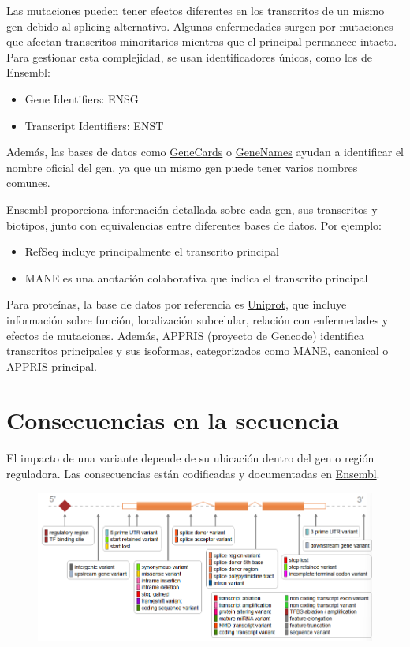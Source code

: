Las mutaciones pueden tener efectos diferentes en los transcritos de un mismo gen debido al splicing alternativo. Algunas enfermedades surgen por mutaciones que afectan transcritos minoritarios mientras que el principal permanece intacto. Para gestionar esta complejidad, se usan identificadores únicos, como los de Ensembl:
\begin{itemize}
\item Gene Identifiers: ENSG 
\item Transcript Identifiers: ENST
\end{itemize}

Además, las bases de datos como \href{https://www.genecards.org/}{GeneCards} o \href{https://www.genenames.org/}{GeneNames} ayudan a identificar el nombre oficial del gen, ya que un mismo gen puede tener varios nombres comunes.

Ensembl proporciona información detallada sobre cada gen, sus transcritos y biotipos, junto con equivalencias entre diferentes bases de datos. Por ejemplo:
\begin{itemize}
\item RefSeq incluye principalmente el transcrito principal
\item MANE es una anotación colaborativa que indica el transcrito principal
\end{itemize}

Para proteínas, la base de datos por referencia es \href{https://www.uniprot.org/}{Uniprot},  que incluye información sobre función, localización subcelular, relación con enfermedades y efectos de mutaciones.
Además, APPRIS (proyecto de Gencode) identifica transcritos principales y sus isoformas, categorizados como MANE, canonical o APPRIS principal.

\section{Consecuencias en la secuencia}
El impacto de una variante depende de su ubicación dentro del gen o región reguladora. Las consecuencias están codificadas y documentadas en \href{https://www.ensembl.org/info/genome/variation/prediction/predicted_data.html}{Ensembl}. 

\begin{figure}[htbp]
\centering
\includegraphics[width = \textwidth]{figs/consequences.png}
\end{figure}

